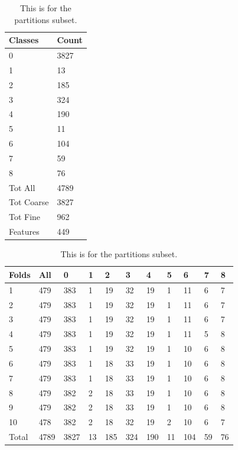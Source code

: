 \documentclass[ms]{nuthesis}
\begin{document}
\FloatBarrier
\begin{table}[!htb]
\centering
\begin{subtable}{.25\linewidth}
  \centering
  \begin{tabular}{|l||l|}\toprule
    Classes & Count \\ \midrule
    0 & 3827 \\
    1 & 13 \\
    2 & 185 \\
    3 & 324 \\
    4 & 190 \\
    5 & 11 \\
    6 & 104 \\
    7 & 59 \\
    8 & 76 \\ \midrule
    Tot All & 4789 \\
    Tot Coarse & 3827 \\
    Tot Fine & 962 \\
    Features & 449 \\ \bottomrule
  \end{tabular}
  \caption{Classes Subset}
  \label{tab:ClassesSub}
\end{subtable}%
\begin{subtable}{.75\linewidth}
\centering
  \begin{tabular}{|l||l||l||l||l||l||l||l||l||l||l|}\toprule
    Folds & All & 0 & 1 & 2 & 3 & 4 & 5 & 6 & 7 & 8 \\ \midrule
    1 & 479 & 383 & 1 & 19 & 32 & 19 & 1 & 11 & 6 & 7 \\
    2 & 479 & 383 & 1 & 19 & 32 & 19 & 1 & 11 & 6 & 7 \\
    3 & 479 & 383 & 1 & 19 & 32 & 19 & 1 & 11 & 6 & 7 \\
    4 & 479 & 383 & 1 & 19 & 32 & 19 & 1 & 11 & 5 & 8 \\
    5 & 479 & 383 & 1 & 19 & 32 & 19 & 1 & 10 & 6 & 8 \\
    6 & 479 & 383 & 1 & 18 & 33 & 19 & 1 & 10 & 6 & 8 \\
    7 & 479 & 383 & 1 & 18 & 33 & 19 & 1 & 10 & 6 & 8 \\
    8 & 479 & 382 & 2 & 18 & 33 & 19 & 1 & 10 & 6 & 8 \\
    9 & 479 & 382 & 2 & 18 & 33 & 19 & 1 & 10 & 6 & 8 \\
    10 & 478 & 382 & 2 & 18 & 32 & 19 & 2 & 10 & 6 & 7 \\ \midrule
    Total & 4789 & 3827 & 13 & 185 & 324 & 190 & 11 & 104 & 59 & 76 \\ \bottomrule
  \end{tabular}
  \caption{Folds Subset}
  \label{tab:PartitionsSubset}
  \end{subtable}
  \caption{This is for the partitions subset.}
  \label{tab:subset}
\end{table}
\FloatBarrier
\end{document}
